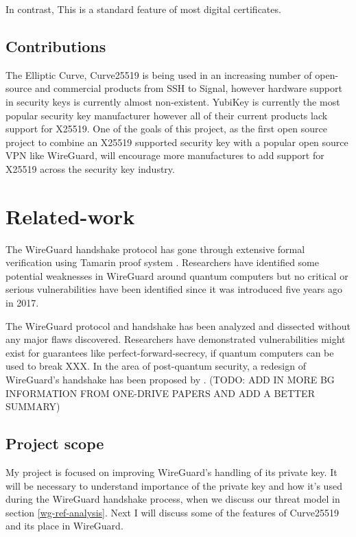 \documentclass [11pt, proquest] {uwthesis}[2020/02/24]
\begin{document}
In contrast, This is a standard feature of most digital certificates.


\section {Contributions}
The Elliptic Curve, Curve25519 is being used in an increasing number of open-source and commercial products\cite{noauthor_things_nodate-1} from SSH to Signal, however hardware support in 
security keys is currently almost non-existent. YubiKey is currently the most popular security key manufacturer however all of their current products 
lack support for X25519. One of the goals of this project, as the first open source project to combine an X25519 supported security key with a popular open source VPN like WireGuard, will encourage more manufactures to add support for X25519 across the security key industry.

\chapter {Related-work}
The WireGuard handshake protocol has gone through extensive formal verification using Tamarin proof system \cite{donenfeld_formal_2018}. Researchers have identified some potential weaknesses in WireGuard around quantum computers but no critical or serious vulnerabilities have been identified since it was introduced five years ago in 2017.

The WireGuard protocol and handshake has been analyzed and dissected without any major flaws discovered. Researchers have demonstrated vulnerabilities might exist for guarantees like perfect-forward-secrecy, if quantum computers can be used to break XXX.  In the area of post-quantum security, a redesign of WireGuard's handshake has been proposed by \cite{hulsing_post-quantum_2021}.
(TODO: ADD IN MORE BG INFORMATION FROM ONE-DRIVE PAPERS AND ADD A BETTER SUMMARY)

\section {Project scope}

My project is focused on improving WireGuard's handling of its private key.
It will be necessary to understand importance of the private key and how it's used during the WireGuard handshake process, when we discuss our threat model in section \ref{wg-ref-analysis}. Next I will discuss some of the features of Curve25519 and its place in WireGuard.
\end{document}
